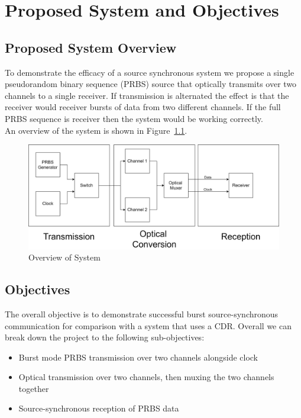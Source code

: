 \chapter{Proposed System and Objectives}

\section{Proposed System Overview}%
\label{sec:system_overview}
To demonstrate the efficacy of a source synchronous system we propose a single
pseudorandom binary sequence (PRBS) source that optically transmits over two
channels to a single receiver. If transmission is alternated the effect is that
the receiver would receiver bursts of data from two different channels. If the
full PRBS sequence is receiver then the system would be working correctly.\\ An
overview of the system is shown in Figure~\ref{fig:overview}. 

\begin{figure}[h]
    \centering
    \includegraphics[width=1\linewidth]{img/overview.png}
    \caption{Overview of System}%
    \label{fig:overview}
\end{figure}

\section{Objectives}%
\label{sec:objectives}
The overall objective is to demonstrate successful burst source-synchronous
communication for comparison with a system that uses a CDR.
\noindent
Overall we can break down the project to the following sub-objectives: 
\begin{itemize}
    \item Burst mode PRBS transmission over two channels alongside clock
    \item Optical transmission over two channels, then muxing the two channels together
    \item Source-synchronous reception of PRBS data 
\end{itemize}
